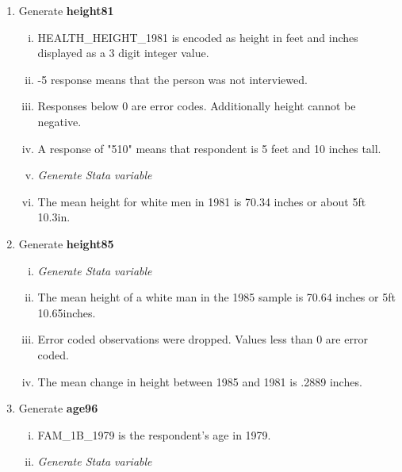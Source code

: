 \documentclass[12pt]{article}
\begin{document}
\begin{enumerate}[\indent a.]
    \item Generate \textbf{height81}
    \begin{enumerate}[(i)]
        \item HEALTH\_HEIGHT\_1981 is encoded as height in feet and inches 
        displayed as a 3 digit integer value.

        \item -5 response means that the person was not interviewed.
        
        \item Responses below 0 are error codes.  Additionally height 
        cannot be negative.
        
        \item A response of "510" means that respondent is 5 feet and 10 
        inches tall.
        
        \item \textit{Generate Stata variable}
        
        \item The mean height for white men in 1981 is 70.34 inches or about 
        5ft 10.3in.
    \end{enumerate}
    
    \item Generate \textbf{height85}
    \begin{enumerate}[(i)]
        \item \textit{Generate Stata variable}
        
        \item The mean height of a white man in the 1985 sample is 70.64 inches 
        or 5ft 10.65inches.

        \item Error coded observations were dropped.  Values less than 0 are 
        error coded.

        \item The mean change in height between 1985 and 1981 is .2889 inches.
    \end{enumerate}
    
    \item Generate \textbf{age96}
    \begin{enumerate}[(i)]
        \item FAM\_1B\_1979 is the respondent's age in 1979.
        
        \item \textit{Generate Stata variable}
    \end{enumerate} 


\end{enumerate}
\end{document}

